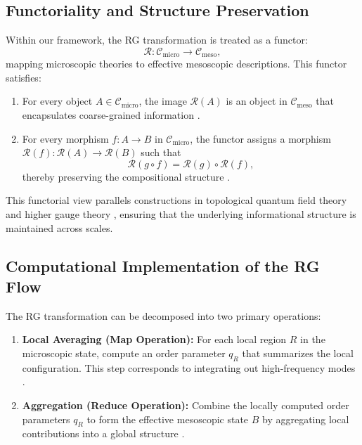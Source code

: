 	\subsection{Functoriality and Structure Preservation}
	
	Within our framework, the RG transformation is treated as a functor:
	\[
	\mathcal{R}: \mathcal{C}_{\text{micro}} \to \mathcal{C}_{\text{meso}},
	\]
	mapping microscopic theories to effective mesoscopic descriptions. This functor satisfies:
	\begin{enumerate}[label=(\alph*)]
		\item For every object \(A \in \mathcal{C}_{\text{micro}}\), the image \(\mathcal{R}(A)\) is an object in \(\mathcal{C}_{\text{meso}}\) that encapsulates coarse-grained information \cite{spivak2014category}.
		\item For every morphism \(f: A \to B\) in \(\mathcal{C}_{\text{micro}}\), the functor assigns a morphism \(\mathcal{R}(f): \mathcal{R}(A) \to \mathcal{R}(B)\) such that
		\[
		\mathcal{R}(g \circ f) = \mathcal{R}(g) \circ \mathcal{R}(f),
		\]
		thereby preserving the compositional structure \cite{atiyah1988topological, segal2004definition}.
	\end{enumerate}
	
	This functorial view parallels constructions in topological quantum field theory \cite{freed1995chern} and higher gauge theory \cite{baez2007higher}, ensuring that the underlying informational structure is maintained across scales.
	
	\subsection{Computational Implementation of the RG Flow}
	
	The RG transformation can be decomposed into two primary operations:
	\begin{enumerate}[label=(\arabic*)]
		\item \textbf{Local Averaging (Map Operation):} For each local region \(R\) in the microscopic state, compute an order parameter \(q_R\) that summarizes the local configuration. This step corresponds to integrating out high-frequency modes \cite{degennes1993physics}.
		\item \textbf{Aggregation (Reduce Operation):} Combine the locally computed order parameters \(q_R\) to form the effective mesoscopic state \(B\) by aggregating local contributions into a global structure \cite{hudak1989conception}.
	\end{enumerate}
	
